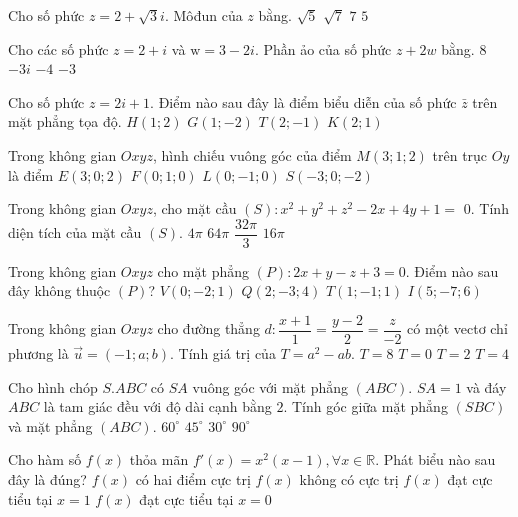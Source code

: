 \begin{ex}%
Cho số phức $z=2+\sqrt{3} i$. Môđun của $z$ bằng.
\choice
{$\sqrt{5}$}
{\True $\sqrt{7}$}
{$7$}
{$5$}

\end{ex}
\begin{ex}%
Cho các số phức $z=2+i$ và $\mathrm{w}=3-2 i$. Phần ảo của số phức $z+2 w$ bằng.
\choice
{$8$}
{$-3 i$}
{$-4$}
{\True $-3$}

\end{ex}
\begin{ex}%
Cho số phức $z=2 i+1$. Điểm nào sau đây là điểm biểu diễn của số phức $\bar{z}$ trên mặt phẳng tọa độ.
\choice
{$H(1; 2)$}
{\True $G(1;-2)$}
{$T(2;-1)$}
{$K(2; 1)$}

\end{ex}
\begin{ex}%
Trong không gian $O x y z$, hình chiếu vuông góc của điểm $M(3; 1; 2)$ trên trục $O y$ là điểm
\choice
{$E(3; 0; 2)$}
{\True $F(0; 1; 0)$}
{$L(0;-1; 0)$}
{$S(-3; 0;-2)$}

\end{ex}
\begin{ex}%
Trong không gian $O x y z$, cho mặt cầu $(S)\colon x^2+y^2+z^2-2 x+4 y+1=$ 0. Tính diện tích của mặt cầu $(S)$.
\choice
{$4\pi$}
{$64\pi$}
{$\dfrac{32\pi}{3}$}
{\True $16\pi$}

\end{ex}
\begin{ex}%
Trong không gian $O x y z$ cho mặt phẳng $(P)\colon 2 x+y-z+3=0$. Điểm nào sau đây không thuộc $(P)$?
\choice
{$V(0;-2; 1)$}
{$Q(2;-3; 4)$}
{\True $T(1;-1; 1)$}
{$I(5;-7; 6)$}

\end{ex}
\begin{ex}%
Trong không gian $O x y z$ cho đường thẳng $d\colon \dfrac{x+1}{1}=\dfrac{y-2}{2}=\dfrac{z}{-2}$ có một vectơ chỉ phương là $\vec{u}=(-1; a; b)$. Tính giá trị của $T=a^2-a b$.
\choice
{\True $T=8$}
{$T=0$}
{$T=2$}
{$T=4$}

\end{ex}
\begin{ex}%
Cho hình chóp $S.ABC$ có $SA$ vuông góc với mặt phẳng $(ABC)$. $SA=1$ và đáy $ABC$ là tam giác đều với độ dài cạnh bằng $2$. Tính góc giữa mặt phẳng $(SBC)$ và mặt phẳng $(ABC)$.
\choice
{$60^{\circ}$}
{$45^{\circ}$}
{\True $30^{\circ}$}
{$90^{\circ}$}

\end{ex}
\begin{ex}%
Cho hàm số $f(x)$ thỏa mãn $f'(x)=x^2(x-1), \forall x \in \mathbb{R}$. Phát biểu nào sau đây là đúng?
\choice
{$f(x)$ có hai điểm cực trị}
{$f(x)$ không có cực trị}
{\True $f(x)$ đạt cực tiểu tại $x=1$}
{$f(x)$ đạt cực tiểu tại $x=0$}

\end{ex}
